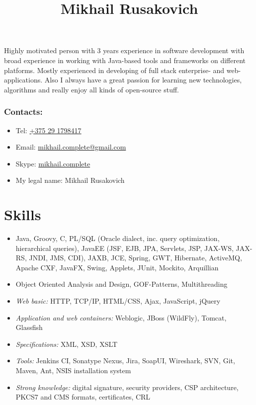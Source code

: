 \documentclass[a4paper, 12pt]{article}
\title{Mikhail Rusakovich}
\author{}
\date{}
\newcommand{\itemlabel}[1]{
    \textit{#1:}}
\begin{document}
\maketitle

Highly motivated person with 3 years experience in software development with broad experience in working with Java-based tools and frameworks on different platforms.
Mostly experienced in developing of full stack enterprise- and web- applications.
Also I always have a great passion for learning new technologies, algorithms and really enjoy all kinds of open-source stuff.

\subsubsection*{Contacts:}
\begin{itemize}
    \item Tel: \href{tel:+375291798417}{+375 29 1798417}
    \item Email: \href{mailto:mikhail.complete@gmail.com}{mikhail.complete@gmail.com}
    \item Skype: \href{callto:mikhail.complete}{mikhail.complete}
    \item My legal name: Mikhail Rusakovich
\end{itemize}


\section*{Skills}

    \begin{itemize}
        \item Java, Groovy, C, PL/SQL (Oracle dialect, inc. query optimization, hierarchical queries), JavaEE (JSF, EJB, JPA, Servlets, JSP, JAX-WS, JAX-RS, JNDI, JMS, CDI), JAXB, JCE, Spring, GWT, Hibernate, ActiveMQ, Apache CXF, JavaFX, Swing, Applets, JUnit, Mockito, Arquillian
        \item Object Oriented Analysis and Design, GOF-Patterns, Multithreading
        \item \itemlabel{Web basic} HTTP, TCP/IP, HTML/CSS, Ajax, JavaScript, jQuery
        \item \itemlabel{Application and web containers} Weblogic, JBoss (WildFly), Tomcat, Glassfish
        \item \itemlabel{Specifications} XML, XSD, XSLT
        \item \itemlabel{Tools} Jenkins CI, Sonatype Nexus, Jira, SoapUI, Wireshark, SVN, Git, Maven, Ant, NSIS installation system
        \item \itemlabel{Strong knowledge} digital signature, security providers, CSP architecture, PKCS7 and CMS formats, certificates, CRL
    \end{itemize}
\end{document}
